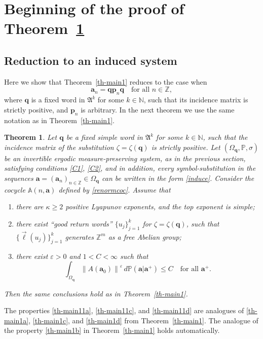 \documentclass[11pt]{article}
\numberwithin{equation}{section}\newcommand{\Relation}[2][]{}\newtheorem*{prop*}{Proposition}
\theoremstyle{plain}
\newtheorem{theorem}{Theorem}[section]
\theoremstyle{definition}
\newcommand\bom{{\boldsymbol a}}\let\ba\bom
\newcommand\bp{{\boldsymbol p}}
\newcommand\bq{{\boldsymbol q}}
\let\eps\varepsilon
\let\Om\Omega
\let\sig\sigma
\newcommand\FrA{\mathfrak{A}}
\newcommand\Aa{\mathbb{A}}
\newcommand{\Z}{\mathbb{Z}}
\newcommand{\N}{\mathbb{N}}
\renewcommand{\P}{\mathbb{P}}
\newcommand\be{\begin{equation}}
\newcommand\ee{\end{equation}}
\begin{document}
\section{Beginning of the proof of Theorem~\ref{th-main11}}\label{sec:4}
\subsection{Reduction to an induced system}

Here we show that Theorem~\ref{th-main1} reduces to the case when
\be \label{induce}
\bom_n = \bq \bp_n \bq\quad \text{for all }n\in \Z,
\ee
where $\bq$ is a fixed word in $\FrA^k$ for some $k\in \N$, such that its incidence matrix is strictly positive, and $\bp_n$ is arbitrary. In the next theorem we use the same notation as in Theorem~\ref{th-main1}.

\begin{theorem} \label{th-main11}
Let $\bq$ be a fixed simple word in $\FrA^k$ for some $k\in \N$, such that the incidence matrix of the substitution $\zeta = \zeta(\bq)$ is strictly positive.
Let $(\Om_\bq,\P,\sig)$ be an invertible ergodic measure-preserving system, as in the previous section, satisfying conditions \eqref{C1}, \eqref{C2}, and in addition, every symbol-substitution in the sequences $\ba=(\ba_n)_{n\in \Z} \in \Om_\bq$ can be written in the form \eqref{induce}.
Consider the cocycle $\Aa(n,\bom)$ defined by \eqref{renormcoc}. Assume that
\begin{enumerate}\renewcommand{\theenumi}{\alph{enumi}$'$}
\item\label{th-main11a}
there are $\kappa\ge 2$ positive Lyapunov exponents,
and the top exponent is simple;
\item\label{th-main11c}
there exist ``good return words'' $\{u_j\}_{j=1}^k$ for $\zeta=\zeta(\bq)$, such that $\{\vec{\ell}(u_j)\}_{j=1}^k$ generates $\Z^m$ as a free Abelian group;
\item\label{th-main11d}
there exist $\eps>0$ and $1<C<\infty$ such that
\be \label{eq-star11}
\int_{\Om_\bq} \left\|A(\bom_0)\right\|^\eps\,d\P(\bom|\bom^+) \le C\quad \text{for all }\bom^+.
\ee
\end{enumerate}
Then the same conclusions hold as in Theorem~\ref{th-main1}.
\end{theorem}

The properties \eqref{th-main11a}, \eqref{th-main11c}, and \eqref{th-main11d} are analogues of \eqref{th-main1a}, \eqref{th-main1c}, and \eqref{th-main1d} from Theorem~\ref{th-main1}. The analogue of the property \eqref{th-main1b} in Theorem~\ref{th-main1} holds automatically.
\end{document}
